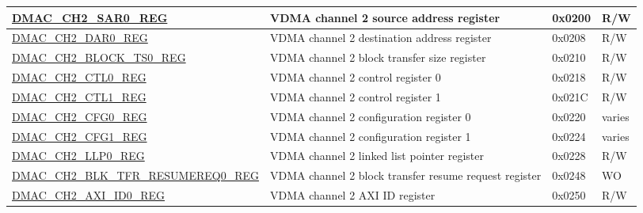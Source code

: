 \begin{longtable}{ | L{7.8cm} | L{6cm} | l | l | }
\hyperref[regdesc:DMACCHNSAR0REG]{DMAC\_CH2\_SAR0\_REG} & VDMA channel 2 source address register & 0x0200 & R/W \\ \hline
\hyperref[regdesc:DMACCHNDAR0REG]{DMAC\_CH2\_DAR0\_REG} & VDMA channel 2 destination address register & 0x0208 & R/W \\ \hline
\hyperref[regdesc:DMACCHNBLOCKTS0REG]{DMAC\_CH2\_BLOCK\_TS0\_REG} & VDMA channel 2 block transfer size register & 0x0210 & R/W \\ \hline
\hyperref[regdesc:DMACCHNCTL0REG]{DMAC\_CH2\_CTL0\_REG} & VDMA channel 2 control register 0 & 0x0218 & R/W \\ \hline
\hyperref[regdesc:DMACCHNCTL1REG]{DMAC\_CH2\_CTL1\_REG} & VDMA channel 2 control register 1 & 0x021C & R/W \\ \hline
\hyperref[regdesc:DMACCHNCFG0REG]{DMAC\_CH2\_CFG0\_REG} & VDMA channel 2 configuration register 0 & 0x0220 & varies \\ \hline
\hyperref[regdesc:DMACCHNCFG1REG]{DMAC\_CH2\_CFG1\_REG} & VDMA channel 2 configuration register 1 & 0x0224 & varies \\ \hline
\hyperref[regdesc:DMACCHNLLP0REG]{DMAC\_CH2\_LLP0\_REG} & VDMA channel 2 linked list pointer register & 0x0228 & R/W \\ \hline
\hyperref[regdesc:DMACCHNBLKTFRRESUMEREQ0REG]{DMAC\_CH2\_BLK\_TFR\_RESUMEREQ0\_REG} & VDMA channel 2 block transfer resume request register & 0x0248 & WO \\ \hline
\hyperref[regdesc:DMACCHNAXIID0REG]{DMAC\_CH2\_AXI\_ID0\_REG} & VDMA channel 2 AXI ID register & 0x0250 & R/W \\ \hline


\end{longtable}
